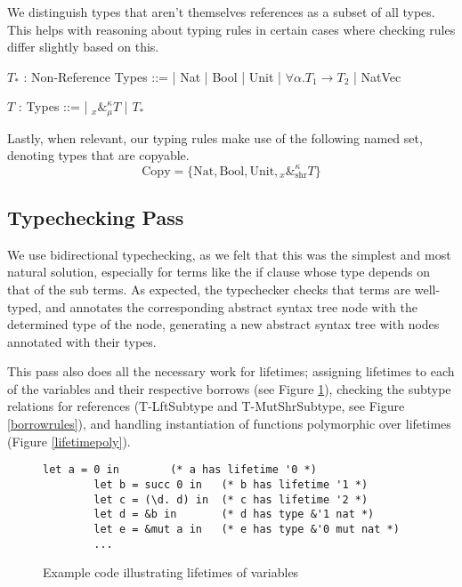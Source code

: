 \documentclass[letterpaper,11pt]{article}
\begin{document}
We distinguish types that aren't themselves references as a subset of all types.
This helps with reasoning about typing rules in certain cases where
checking rules differ slightly based on this.
\begin{center}
    \begin{bnf}
        $T_*$ : \textsf{Non-Reference Types} ::=
        | Nat | Bool | Unit | $\forall\alpha.T_1\rightarrow T_2$ | NatVec
    \end{bnf}
    
    \begin{bnf}
        $T$ : \textsf{Types} ::=
        | ${}_{x}\&^\kappa_\mu T$ | $T_*$
    \end{bnf}
\end{center}

Lastly, when relevant, our typing rules make use of the following named set,
denoting types that are copyable.
$$\text{Copy}=\{\text{Nat}, \text{Bool}, \text{Unit},{}_{x}\&^\kappa_{\text{shr}} T\}$$

\subsection{Typechecking Pass}
We use bidirectional typechecking, as we felt that this was the simplest and
most natural solution, especially for terms like the if clause whose type depends
on that of the sub terms. As expected, the typechecker checks that terms are
well-typed, and annotates the corresponding abstract syntax tree node with
the determined type of the node, generating a new abstract syntax tree with nodes
annotated with their types.

This pass also does all the necessary work for lifetimes; assigning lifetimes
to each of the variables and their respective borrows (see Figure \ref{varlifetimes}), 
checking the subtype relations for references (T-LftSubtype and T-MutShrSubtype, see Figure \ref{borrowrules}), and handling instantiation of functions polymorphic over
lifetimes (Figure \ref{lifetimepoly}). 

\begin{figure}[h]
    \begin{lstlisting}[language=caml]
        let a = 0 in        (* a has lifetime '0 *)
        let b = succ 0 in   (* b has lifetime '1 *)
        let c = (\d. d) in  (* c has lifetime '2 *)
        let d = &b in       (* d has type &'1 nat *)
        let e = &mut a in   (* e has type &'0 mut nat *)
        ...
    \end{lstlisting}

    \caption{Example code illustrating lifetimes of variables}
    \label{varlifetimes}
\end{figure}
\end{document}
